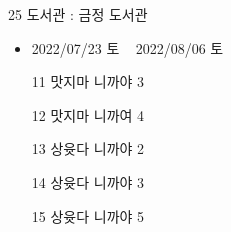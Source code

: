 \documentclass[aspectratio=1610,17pt,xcolor=pdftex,dvipsnames,table,handout]{beamer}
\begin{document}
%
%
%
%
%								
%

		\begin{frame} [t,plain]

			\begin{block} { 25 도서관 : 금정 도서관 }

			\begin{itemize}
			\item 	2022/07/23 토 ~ 2022/08/06 토
			\item 	[11]     맛지마 니까야 3
		      \item 	[12]     맛지마 니까여 4
		      \item 	[13]     상윳다 니까야  2
		      \item 	[14]     상윳다 니까야  3  
		      \item 	[15]     상윳다 니까야  5
			\end{itemize}

			\end{block}			
								
		\end{frame}	 %


		\begin{frame} [t,plain]

								
		\end{frame}	 %
\end{document}

